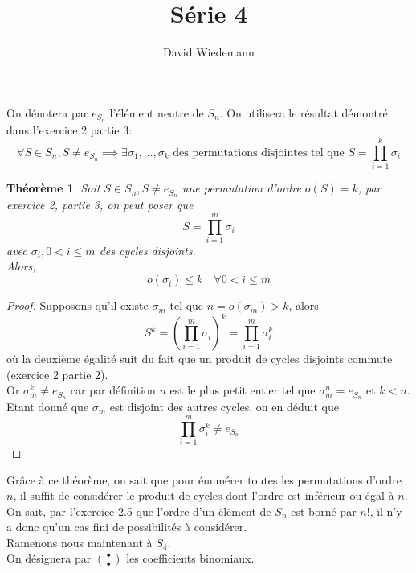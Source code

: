 \documentclass[11pt, a4paper]{article}
\newtheorem{theorem}{Théorème}
\begin{document}
\title{Série 4}
\author{David Wiedemann}
\maketitle
On dénotera par $e_{S_n} $ l'élément neutre de $S_n$.
On utilisera le résultat démontré dans l'exercice 2 partie 3:
\[ 
	\forall S \in S_n, S \neq e_{S_n}  \implies \exists \sigma_1,\ldots,\sigma_k \text{ des permutations disjointes tel que } S = \prod_{i=1} ^{k} \sigma_i
\]

\begin{theorem}
	Soit $S \in S_n, S \neq e_{S_n} $ une permutation d'ordre $o(S)=k$, par exercice 2, partie 3, on peut poser que
	\[
		S = \prod_{i=1} ^{m} \sigma_i
	\]
	avec $\sigma_i, 0<i\leq m$ des cycles disjoints.\\
	Alors,
	\[ 
		o(\sigma_i) \leq k \quad \forall 0< i \leq m
	\]
\end{theorem}
\begin{proof}
	Supposons qu'il existe $\sigma_m$ tel que $n=o(\sigma_m) > k$, alors
	 \[ 
		 S^{k}= \left(\prod_{i=1} ^{m} \sigma_i\right)^{k} = \prod_{i=1} ^{m} \sigma_i^{k}
	\]
	où la deuxième égalité suit du fait que un produit de cycles disjoints commute (exercice 2 partie 2).\\
	Or $\sigma_m^{k} \neq e_{S_n}$ car par définition $n$ est le plus petit entier tel que $\sigma_m^{n}=e_{S_n}$ et $k<n$.\\
	Etant donné que $\sigma_m$ est disjoint des autres cycles, on en déduit que 
	\[ 
\prod_{i=1} ^{m} \sigma_i^{k} \neq e_{S_n} 
	\]
\end{proof}
Grâce à ce théorème, on sait que pour énumérer toutes les permutations d'ordre $n$, il suffit de considérer le produit de cycles dont l'ordre est inférieur ou égal à $n$.\\
On sait, par l'exercice 2.5 que l'ordre d'un élément de $S_n$ est borné par $n!$, il n'y a donc qu'un cas fini de possibilités à considérer.\\
Ramenons nous maintenant à $S_4$.\\
On désignera par $\binom{\bullet}{\bullet}$ les coefficients binomiaux.
\end{document}
